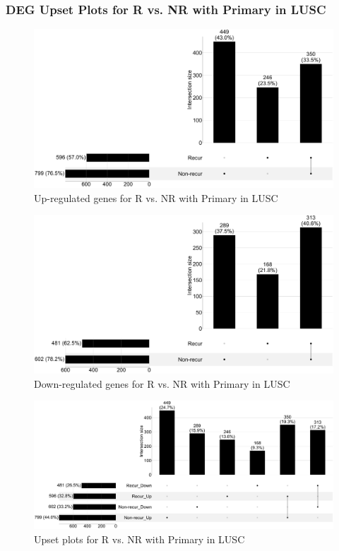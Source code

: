 \documentclass{beamer}
\begin{document}
     \begin{frame}[allowframebreaks]
        \frametitle{DEG Upset Plots for R vs. NR with Primary in LUSC}

        \begin{figure}
            \includegraphics[width=0.8 \linewidth]{figures/DEG/Pair-Venn/STAR.FPKM.SQC-Primary.Recur-Nonrecur.Up.venn.pdf}
            \caption{Up-regulated genes for R vs. NR with Primary in LUSC}
        \end{figure}

        \begin{figure}
            \includegraphics[width=0.8 \linewidth]{figures/DEG/Pair-Venn/STAR.FPKM.SQC-Primary.Recur-Nonrecur.Down.venn.pdf}
            \caption{Down-regulated genes for R vs. NR with Primary in LUSC}
        \end{figure}

        \begin{figure}
            \includegraphics[width=0.8 \linewidth]{figures/DEG/Pair-Venn/STAR.FPKM.SQC-Primary.Recur-Nonrecur.venn.pdf}
            \caption{Upset plots for R vs. NR with Primary in LUSC}
        \end{figure}
    \end{frame}
\end{document}
